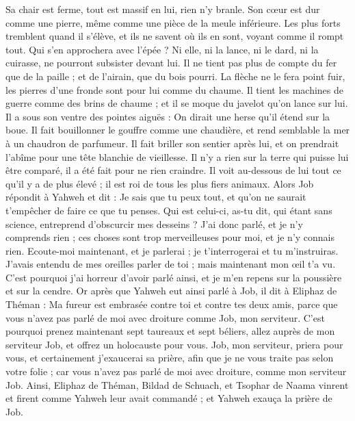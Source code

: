 \begin{multicols}{2}
Sa chair est ferme, tout est massif en lui, rien n'y branle. 
Son cœur est dur comme une pierre, même comme une pièce de la meule inférieure.
Les plus forts tremblent quand il s'élève, et ils ne savent où ils en sont, voyant comme il rompt tout. 
Qui s'en approchera avec l'épée ? Ni elle, ni la lance, ni le dard, ni la cuirasse, ne pourront subsister devant lui.
Il ne tient pas plus de compte du fer que de la paille ; et de l'airain, que du bois pourri. 
La flèche ne le fera point fuir, les pierres d'une fronde sont pour lui comme du chaume.
Il tient les machines de guerre comme des brins de chaume ; et il se moque du javelot qu'on lance sur lui. 
Il a sous son ventre des pointes aiguës : On dirait une herse qu'il étend sur la boue.
Il fait bouillonner le gouffre comme une chaudière, et rend semblable la mer à un chaudron de parfumeur. 
Il fait briller son sentier après lui, et on prendrait l'abîme pour une tête blanchie de vieillesse.
Il n'y a rien sur la terre qui puisse lui être comparé, il a été fait pour ne rien craindre.
Il voit au-dessous de lui tout ce qu'il y a de plus élevé ; il est roi de tous les plus fiers animaux.
\VerseOne{}Alors Job répondit à Yahweh et dit :
Je sais que tu peux tout, et qu'on ne saurait t'empêcher de faire ce que tu penses.
Qui est celui-ci, as-tu dit, qui étant sans science, entreprend d'obscurcir mes desseins ? J'ai donc parlé, et je n'y comprends rien ; ces choses sont trop merveilleuses pour moi, et je n'y connais rien.
Ecoute-moi maintenant, et je parlerai ; je t'interrogerai et tu m'instruiras.
J'avais entendu de mes oreilles parler de toi ; mais maintenant mon œil t'a vu.
C'est pourquoi j'ai horreur d'avoir parlé ainsi, et je m'en repens sur la poussière et sur la cendre.
Or après que Yahweh eut ainsi parlé à Job, il dit à Eliphaz de Théman : Ma fureur est embrasée contre toi et contre tes deux amis, parce que vous n'avez pas parlé de moi avec droiture comme Job, mon serviteur.
C'est pourquoi prenez maintenant sept taureaux et sept béliers, allez auprès de mon serviteur Job, et offrez un holocauste pour vous. Job, mon serviteur, priera pour vous, et certainement j'exaucerai sa prière, afin que je ne vous traite pas selon votre folie ; car vous n'avez pas parlé de moi avec droiture, comme mon serviteur Job.
 Ainsi, Eliphaz de Théman, Bildad de Schuach, et Tsophar de Naama vinrent et firent comme Yahweh leur avait commandé ; et Yahweh exauça la prière de Job.

\end{multicols}
